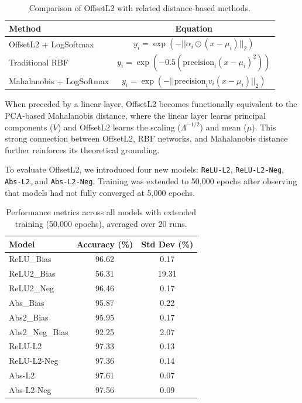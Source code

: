 \begin{table}[H]
    \centering
    \footnotesize
    \begin{tabular}{lc}
        \toprule
        \textbf{Method} & \textbf{Equation} \\
        \midrule
        OffsetL2 + LogSoftmax & $ y_i = \exp(-||\alpha_i \odot (x - \mu_i) ||_2) $ \\  
        Traditional RBF & $ y_i = \exp(-0.5 (\text{precision}_i (x - \mu_i)^2)) $ \\  
        Mahalanobis + LogSoftmax & $ y_i = \exp(-||\text{precision}_i v_i (x - \mu_i)||_2) $ \\  
        \bottomrule
    \end{tabular}
    \caption{Comparison of OffsetL2 with related distance-based methods.}
    \label{tab:comparison_offsetl2}
\end{table}

When preceded by a linear layer, OffsetL2 becomes functionally equivalent to the PCA-based Mahalanobis distance, where the linear layer learns principal components ($V$) and OffsetL2 learns the scaling ($\Lambda^{-1/2}$) and mean ($\mu$). This strong connection between OffsetL2, RBF networks, and Mahalanobis distance further reinforces its theoretical grounding.

To evaluate OffsetL2, we introduced four new models: \texttt{ReLU-L2}, \texttt{ReLU-L2-Neg}, \texttt{Abs-L2}, and \texttt{Abs-L2-Neg}. Training was extended to 50,000 epochs after observing that models had not fully converged at 5,000 epochs.


\begin{table}[H]
    \centering
    \footnotesize
    \begin{tabular}{lcc}
    \toprule
    \textbf{Model} & \textbf{Accuracy (\%)} & \textbf{Std Dev (\%)} \\
    \midrule
    ReLU\_Bias & 96.62 & 0.17 \\
    ReLU2\_Bias & 56.31 & 19.31 \\
    ReLU2\_Neg & 96.46 & 0.17 \\
    Abs\_Bias & 95.87 & 0.22 \\
    Abs2\_Bias & 95.95 & 0.17 \\
    Abs2\_Neg\_Bias & 92.25 & 2.07 \\
    \midrule
    ReLU-L2 & 97.33 & 0.13 \\
    ReLU-L2-Neg & 97.36 & 0.14 \\
    Abs-L2 & 97.61 & 0.07 \\
    Abs-L2-Neg & 97.56 & 0.09 \\
    \bottomrule
    \end{tabular}
    \caption{Performance metrics across all models with extended training (50,000 epochs), averaged over 20 runs.}
    \label{tab:extended_training}
\end{table}

